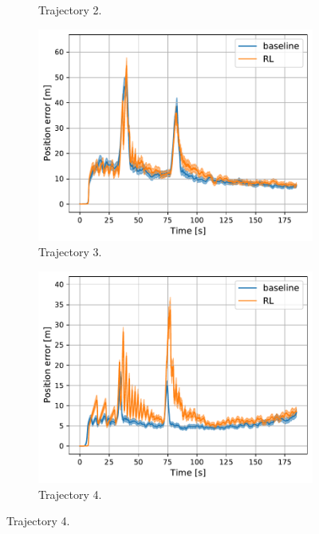 \documentclass[english, 12pt, a4paper, elec, utf8, a-1b, online]{aaltothesis}
\begin{document}
\begin{figure}
\begin{subfigure}[b]{0.45\textwidth}
        \caption{Trajectory 2.}
        \label{fig:PE_T2}
    \end{subfigure}
    \hfill
    \begin{subfigure}[b]{0.45\textwidth}
        \centering
        \includegraphics[width=\linewidth]{figures/benchmark/Simulations/mean_position_error2.pdf}
        \caption{Trajectory 3.}
        \label{fig:PE_T3}
    \end{subfigure}
    \hfill
    \begin{subfigure}[b]{0.45\textwidth}
        \centering
        \includegraphics[width=\linewidth]{figures/benchmark/Simulations/mean_position_error3.pdf}
        \caption{Trajectory 4.}
        \label{fig:PE_T4}

\end{subfigure}
\end{figure}
\end{document}
